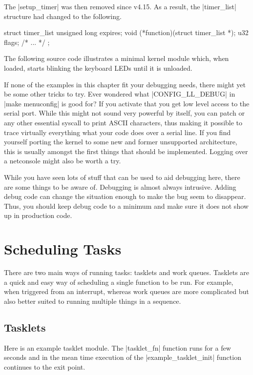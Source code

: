 \documentclass[10pt, oneside]{book}
\begin{document}
The \cpp|setup_timer| was then removed since v4.15.
As a result, the \cpp|timer_list| structure had changed to the following.
\begin{code}
struct timer_list {
    unsigned long expires;
    void (*function)(struct timer_list *);
    u32 flags;
    /* ... */
};
\end{code}

The following source code illustrates a minimal kernel module which, when loaded, starts blinking the keyboard LEDs until it is unloaded.


If none of the examples in this chapter fit your debugging needs, there might yet be some other tricks to try.
Ever wondered what \cpp|CONFIG_LL_DEBUG| in \sh|make menuconfig| is good for?
If you activate that you get low level access to the serial port.
While this might not sound very powerful by itself, you can patch  or any other essential syscall to print ASCII characters, thus making it possible to trace virtually everything what your code does over a serial line.
If you find yourself porting the kernel to some new and former unsupported architecture, this is usually amongst the first things that should be implemented.
Logging over a netconsole might also be worth a try.

While you have seen lots of stuff that can be used to aid debugging here, there are some things to be aware of. Debugging is almost always intrusive.
Adding debug code can change the situation enough to make the bug seem to disappear.
Thus, you should keep debug code to a minimum and make sure it does not show up in production code.

\section{Scheduling Tasks}
\label{sec:scheduling_tasks}
There are two main ways of running tasks: tasklets and work queues.
Tasklets are a quick and easy way of scheduling a single function to be run.
For example, when triggered from an interrupt, whereas work queues are more complicated but also better suited to running multiple things in a sequence.

\subsection{Tasklets}
\label{sec:tasklet}
Here is an example tasklet module.
The \cpp|tasklet_fn| function runs for a few seconds and in the mean time execution of the \cpp|example_tasklet_init| function continues to the exit point.
\end{document}
